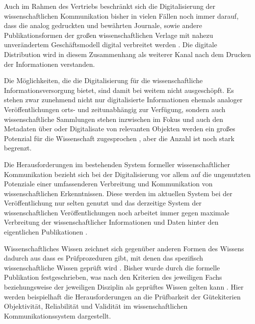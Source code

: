 Auch im Rahmen des Vertriebs beschränkt sich die Digitalisierung der wissenschaftlichen Kommunikation bisher in vielen Fällen noch immer darauf, dass die analog gedruckten und bewährten Journale, sowie andere Publikationsformen der großen wissenschaftlichen Verlage mit nahezu unverändertem Geschäftsmodell digital verbreitet werden \cite{Hanekop_2014} \cite[:179]{Fehling_2014}. Die digitale Distribution wird in diesem Zusammenhang als weiterer Kanal nach dem Drucken der Informationen verstanden.

Die Möglichkeiten, die die Digitalisierung für die wissenschaftliche Informationsversorgung bietet, sind damit bei weitem nicht ausgeschöpft. Es stehen zwar zunehmend nicht nur digitalisierte Informationen ehemals analoger Veröffentlichungen orts- und zeitunabhängig zur Verfügung, sondern auch wissenschaftliche Sammlungen stehen inzwischen im Fokus und auch den Metadaten über oder Digitalisate von relevanten Objekten werden ein großes Potenzial für die Wissenschaft zugesprochen \cite{winkler_2011_anforderungen}, aber die Anzahl ist noch stark begrenzt.

Die Herausforderungen im bestehenden System formeller wissenschaftlicher Kommunikation bezieht sich bei der Digitalisierung vor allem auf die ungenutzten Potenziale einer umfassenderen Verbreitung und Kommunikation von wissenschaftlichen Erkenntnissen. Diese werden im aktuellen System bei der Veröffentlichung nur selten genutzt und das derzeitige System der wissenschaftlichen Veröffentlichungen noch arbeitet immer gegen maximale Verbreitung der wissenschaftlicher Informationen und Daten hinter den eigentlichen Publikationen \cite{Molloy_2011}.


Wissenschaftliches Wissen zeichnet sich gegenüber anderen Formen des Wissens dadurch aus dass es Prüfprozeduren gibt, mit denen das spezifisch wissenschaftliche Wissen geprüft wird \cite{Luhmann1998}. Bisher wurde durch die formelle Publikation festgeschrieben, was nach den Kriterien des jeweiligen Fachs beziehungsweise der jeweiligen Disziplin als geprüftes Wissen gelten kann \cite[:11]{bbaw_publizieren_2015}. Hier werden beispielhaft die Herausforderungen an die Prüfbarkeit der Gütekiterien Objektivität, Reliabilität und Validität im wissenschaftlichen  Kommunikationssystem dargestellt.

